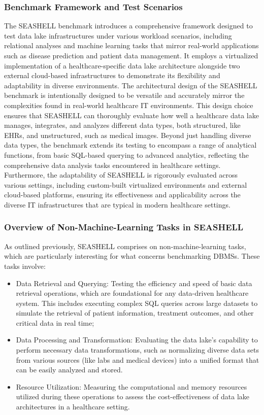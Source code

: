 \subsubsection{Benchmark Framework and Test Scenarios}
The SEASHELL benchmark introduces a comprehensive framework designed to test data lake infrastructures under various workload scenarios, including relational analyses and machine learning tasks that mirror real-world applications such as disease prediction and patient data management. It employs a virtualized implementation of a healthcare-specific data lake architecture alongside two external cloud-based infrastructures to demonstrate its flexibility and adaptability in diverse environments. The architectural design of the SEASHELL benchmark is intentionally designed to be versatile and accurately mirror the complexities found in real-world healthcare \ac{IT} environments. This design choice ensures that SEASHELL can thoroughly evaluate how well a healthcare data lake manages, integrates, and analyzes different data types, both structured, like \ac{EHR}s, and unstructured, such as medical images. Beyond just handling diverse data types, the benchmark extends its testing to encompass a range of analytical functions, from basic SQL-based querying to advanced analytics, reflecting the comprehensive data analysis tasks encountered in healthcare settings. Furthermore, the adaptability of SEASHELL is rigorously evaluated across various settings, including custom-built virtualized environments and external cloud-based platforms, ensuring its effectiveness and applicability across the diverse \ac{IT} infrastructures that are typical in modern healthcare settings.
\subsubsection{Overview of Non-Machine-Learning Tasks in SEASHELL}
As outlined previously, SEASHELL comprises on non-machine-learning tasks, which are particularly interesting for what concerns benchmarking \ac{DBMS}s. These tasks involve:
\begin{itemize}
	\item Data Retrieval and Querying: Testing the efficiency and speed of basic data retrieval operations, which are foundational for any data-driven healthcare system. This includes executing complex SQL queries across large datasets to simulate the retrieval of patient information, treatment outcomes, and other critical data in real time;
	\item Data Processing and Transformation: Evaluating the data lake's capability to perform necessary data transformations, such as normalizing diverse data sets from various sources (like labs and medical devices) into a unified format that can be easily analyzed and stored.
	\item Resource Utilization: Measuring the computational and memory resources utilized during these operations to assess the cost-effectiveness of data lake architectures in a healthcare setting.
\end{itemize}

